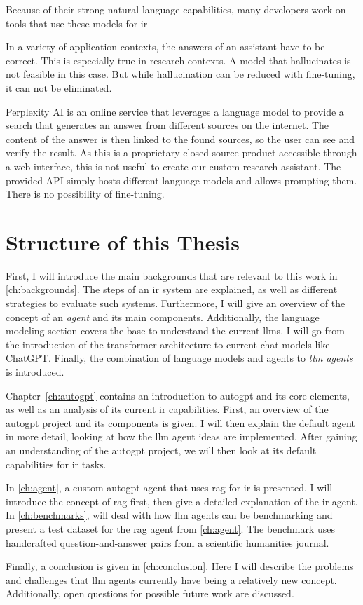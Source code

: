 \documentclass[../main.tex]{subfiles}
\begin{document}
Because of their strong natural language capabilities,
many developers work on tools that use these models for \gls{ir}

In a variety of application contexts,
the answers of an assistant have to be correct.
This is especially true in research contexts.
A model that hallucinates is not feasible in this case. %
But while hallucination can be reduced with fine-tuning,
it can not be eliminated.

Perplexity AI \cite{zotero-197} is an online service that leverages a language model
to provide a search that generates an answer from different sources on the internet.
The content of the answer is then linked to the found sources,
so the user can see and verify the result.
As this is a proprietary closed-source product accessible through a web interface,
this is not useful to create our custom research assistant.
The provided API simply hosts different language models and allows prompting them.
There is no possibility of fine-tuning.

\section{Structure of this Thesis}

First, I will introduce the main backgrounds
that are relevant to this work in \autoref{ch:backgrounds}.
The steps of an \gls{ir} system are explained, as well
as different strategies to evaluate such systems.
Furthermore, I will give an overview of the concept of an \emph{agent} and its main components.
Additionally, the language modeling section covers the base
to understand the current \glspl{llm}.
I will go from the introduction of the transformer architecture to current chat models like ChatGPT.
Finally, the combination of language models and agents to \emph{\gls{llm} agents} is introduced.

Chapter~\ref{ch:autogpt} contains an introduction to \gls{autogpt} and its core elements,
as well as an analysis of its current \gls{ir} capabilities.
First, an overview of the \gls{autogpt} project and its components is given.
I will then explain the default agent in more detail,
looking at how the \gls{llm} agent ideas are implemented.
After gaining an understanding of the \gls{autogpt} project,
we will then look at its default capabilities for \gls{ir} tasks.

In \autoref{ch:agent},
a custom \gls{autogpt} agent that uses \gls{rag} for \gls{ir} is presented.
I will introduce the concept of \gls{rag} first, then give a detailed explanation
of the \gls{ir} agent.
In \autoref{ch:benchmarks}, will deal with how \gls{llm} agents can be benchmarking
and present a test dataset for the \gls{rag} agent from \autoref{ch:agent}.
The benchmark uses handcrafted question-and-answer pairs from a scientific humanities journal.

Finally, a conclusion is given in \autoref{ch:conclusion}.
Here I will describe the problems and challenges
that \gls{llm} agents currently have being a relatively new concept.
Additionally, open questions for possible future work are discussed.
\end{document}
